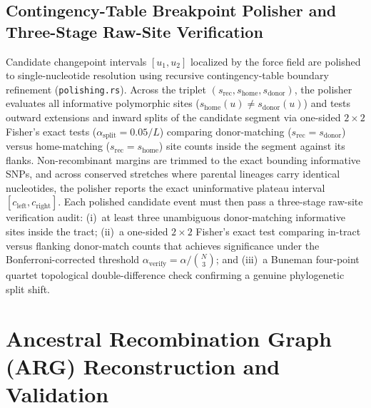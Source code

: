 \subsection{Contingency-Table Breakpoint Polisher and Three-Stage Raw-Site Verification}
Candidate changepoint intervals $[u_1, u_2]$ localized by the force field are polished to single-nucleotide resolution using recursive contingency-table boundary refinement (\texttt{polishing.rs}).
Across the triplet $(s_{\mathrm{rec}}, s_{\mathrm{home}}, s_{\mathrm{donor}})$, the polisher evaluates all informative polymorphic sites ($s_{\mathrm{home}}(u) \ne s_{\mathrm{donor}}(u)$) and tests outward extensions and inward splits of the candidate segment via one-sided $2\times 2$ Fisher's exact tests ($\alpha_{\mathrm{split}} = 0.05 / L$) comparing donor-matching ($s_{\mathrm{rec}} = s_{\mathrm{donor}}$) versus home-matching ($s_{\mathrm{rec}} = s_{\mathrm{home}}$) site counts inside the segment against its flanks.
Non-recombinant margins are trimmed to the exact bounding informative SNPs, and across conserved stretches where parental lineages carry identical nucleotides, the polisher reports the exact uninformative plateau interval $[c_{\mathrm{left}}, c_{\mathrm{right}}]$.
Each polished candidate event must then pass a three-stage raw-site verification audit: (i)~at least three unambiguous donor-matching informative sites inside the tract; (ii)~a one-sided $2\times 2$ Fisher's exact test comparing in-tract versus flanking donor-match counts that achieves significance under the Bonferroni-corrected threshold $\alpha_{\mathrm{verify}} = \alpha / \binom{N}{3}$; and (iii)~a Buneman four-point quartet topological double-difference check confirming a genuine phylogenetic split shift.

\section{Ancestral Recombination Graph (ARG) Reconstruction and Validation}
\label{supp:arg_validation}

